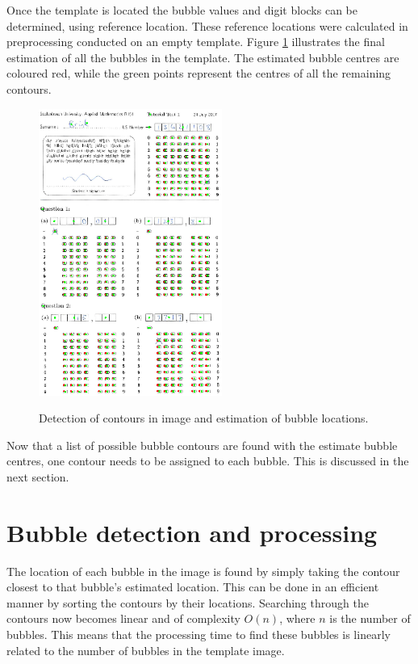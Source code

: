 Once the template is located the bubble values and digit blocks can be determined, using reference location. These reference locations were calculated in preprocessing conducted on an empty template. Figure \ref{fig:FinalEstimate} illustrates the final estimation of all the bubbles in the template. The estimated bubble centres are coloured red, while the green points represent the centres of all the remaining contours.

\begin{figure}
  \centering
  \includegraphics[width=6cm]{FinalEstimate}\\
  \caption{Detection of contours in image and estimation of bubble locations.}
  \label{fig:FinalEstimate}
\end{figure}

Now that a list of possible bubble contours are found with the estimate bubble centres, one contour needs to be assigned to each bubble. This is discussed in the next section.

\section{Bubble detection and processing}
The location of each bubble in the image is found by simply taking the contour closest to that bubble's estimated location. This can be done in an efficient manner by sorting the contours by their locations. Searching through the contours now becomes linear and of complexity $O(n)$, where $n$ is the number of bubbles. This means that the processing time to find these bubbles is linearly related to the number of bubbles in the template image. 


